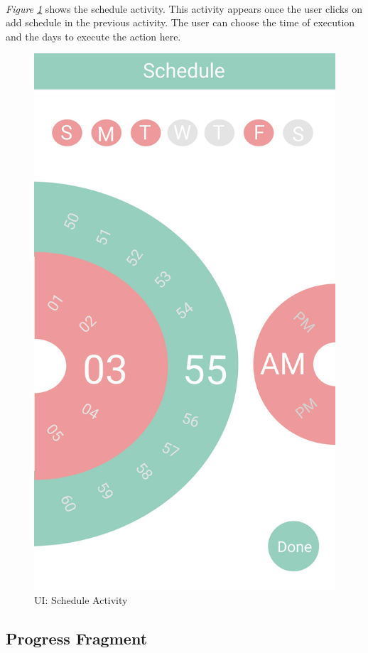 \documentclass[12pt, oneside, a4paper]{book}
\begin{document}
		\paragraph{} \textit{Figure \ref{fig:activity_schedule}} shows the schedule activity. This activity appears once the user clicks on add schedule in the previous activity. The user can choose the time of execution and the days to execute the action here.
		\begin{figure}[H]
			\centering
			\includegraphics[width=.5\linewidth]{img/activity_schedule.jpg}
			\caption{UI: Schedule Activity}
			\label{fig:activity_schedule}
	\end{figure}
		\newpage\subsection{Progress Fragment}
\end{document}
